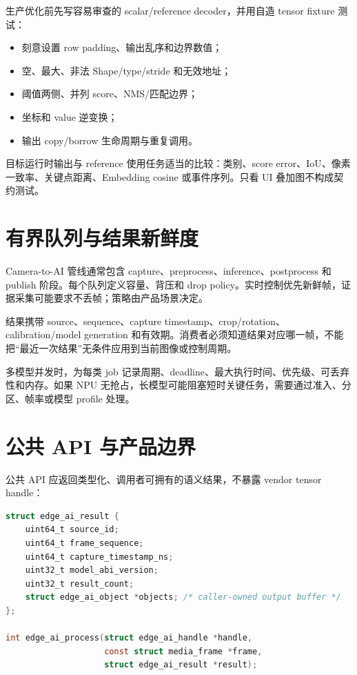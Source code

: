 生产优化前先写容易审查的 scalar/reference decoder，并用自造 tensor fixture 测试：

\begin{itemize}
  \item 刻意设置 row padding、输出乱序和边界数值；
  \item 空、最大、非法 Shape/type/stride 和无效地址；
  \item 阈值两侧、并列 score、NMS/匹配边界；
  \item 坐标和 value 逆变换；
  \item 输出 copy/borrow 生命周期与重复调用。
\end{itemize}

目标运行时输出与 reference 使用任务适当的比较：类别、score error、IoU、像素一致率、关键点距离、Embedding cosine 或事件序列。只看 UI 叠加图不构成契约测试。

\section{有界队列与结果新鲜度}

Camera-to-AI 管线通常包含 capture、preprocess、inference、postprocess 和 publish 阶段。每个队列定义容量、背压和 drop policy。实时控制优先新鲜帧，证据采集可能要求不丢帧；策略由产品场景决定。

结果携带 source、sequence、capture timestamp、crop/rotation、calibration/model generation 和有效期。消费者必须知道结果对应哪一帧，不能把“最近一次结果”无条件应用到当前图像或控制周期。

多模型并发时，为每类 job 记录周期、deadline、最大执行时间、优先级、可丢弃性和内存。如果 NPU 无抢占，长模型可能阻塞短时关键任务，需要通过准入、分区、帧率或模型 profile 处理。

\section{公共 API 与产品边界}

公共 API 应返回类型化、调用者可拥有的语义结果，不暴露 vendor tensor handle：

\begin{lstlisting}[language=C,caption={模型语义结果 API 示例}]
struct edge_ai_result {
    uint64_t source_id;
    uint64_t frame_sequence;
    uint64_t capture_timestamp_ns;
    uint32_t model_abi_version;
    uint32_t result_count;
    struct edge_ai_object *objects; /* caller-owned output buffer */
};

int edge_ai_process(struct edge_ai_handle *handle,
                    const struct media_frame *frame,
                    struct edge_ai_result *result);
\end{lstlisting}

